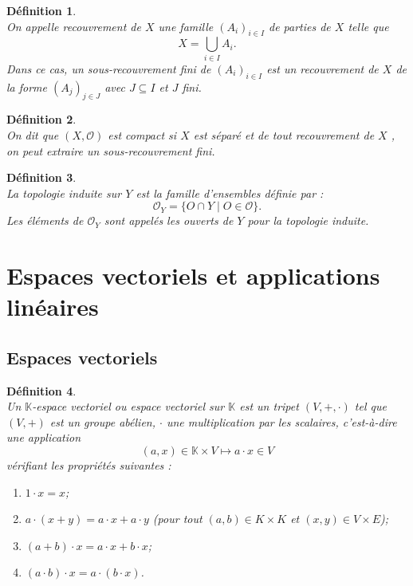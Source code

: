 \documentclass[a4paper, 14pt]{report}
\newtheorem{definition}{Définition}[section]
\begin{document}
\begin{onehalfspace}
{			
			\begin{definition} \cite{kuratowski2014topology}\\
On appelle recouvrement de \( X \) une famille \( (A_i)_{i \in I} \) de parties de \( X \) telle que 
				\[
				X = \bigcup_{i \in I} A_i.
				\]
Dans ce cas, un sous-recouvrement fini de \( (A_i)_{i \in I} \) est un recouvrement de \( X \) de la forme \( (A_j)_{j \in J} \) avec \( J \subseteq I \) et \(J\) fini.
			\end{definition}
			
			\begin{definition} \cite{kuratowski2014topology}\\
On dit que \( (X, \mathcal{O})\) est compact si \( X \) est séparé et de tout recouvrement de \( X \) , on peut extraire un sous-recouvrement fini.
			\end{definition}
			
			
			\begin{definition} \cite{kuratowski2014topology}\\
La topologie induite sur \( Y \) est la famille d’ensembles définie par :
				\[
				\mathcal{O}_Y = \{ O \cap Y \mid O \in \mathcal{O} \}.
				\]
Les éléments de \( \mathcal{O}_Y \) sont appelés les ouverts de \( Y \) pour la topologie induite.
			\end{definition}
			
			
			\section{Espaces vectoriels et applications linéaires}
			\subsection{Espaces vectoriels}
	
			

			
			\begin{definition} \cite{lang2012algebra}\\
Un \(\mathbb{K}\)-espace vectoriel ou espace vectoriel sur \(\mathbb{K}\) est un tripet $( V,+ ,\cdot)$ tel que $( V,+)$ est un groupe abélien, $\cdot$ une multiplication par les scalaires, c'est-à-dire une application
				\[
				(a, x) \in \mathbb{K} \times V \mapsto a \cdot x \in V
				\]
				vérifiant les propriétés suivantes :
				
				\begin{enumerate} [label=\roman*)]
					\item \( 1 \cdot x = x \);
					\item \( a \cdot (x + y) = a \cdot x + a \cdot y \) (pour tout \( (a, b) \in K \times K \) et \( (x, y) \in V \times E \));
					\item \( (a + b) \cdot x = a \cdot x + b \cdot x \);
					\item \( (a \cdot b) \cdot x = a\cdot (b \cdot x) \).
				\end{enumerate}
			\end{definition}
			
}
\end{onehalfspace}
\end{document}
